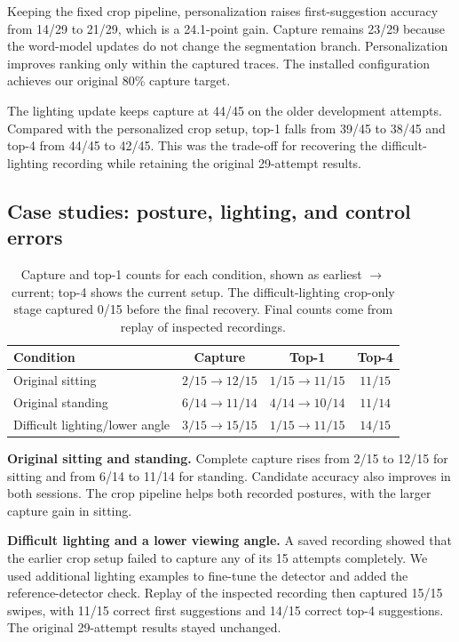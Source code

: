 \documentclass[preprint,12pt]{elsarticle}
\begin{document}
Keeping the fixed crop pipeline, personalization raises first-suggestion accuracy from 14/29 to 21/29, which is a 24.1-point gain. Capture remains 23/29 because the word-model updates do not change the segmentation branch. Personalization improves ranking only within the captured traces. The installed configuration achieves our original 80\% capture target.




The lighting update keeps capture at 44/45 on the older development attempts. Compared with the personalized crop setup, top-1 falls from 39/45 to 38/45 and top-4 from 44/45 to 42/45. This was the trade-off for recovering the difficult-lighting recording while retaining the original 29-attempt results.

\subsection{Case studies: posture, lighting, and control errors}
\begin{table}[H]
\centering
\caption{Capture and top-1 counts for each condition, shown as earliest $\to$ current; top-4 shows the current setup. The difficult-lighting crop-only stage captured 0/15 before the final recovery. Final counts come from replay of inspected recordings.}
\label{tab:cases}
\begingroup\small{}
\begin{tabularx}{\linewidth}{Xccc}
\toprule
Condition & Capture & Top-1 & Top-4 \\
\midrule
Original sitting & $2/15\to12/15$ & $1/15\to11/15$ & $11/15$ \\
Original standing & $6/14\to11/14$ & $4/14\to10/14$ & $11/14$ \\
Difficult lighting/lower angle & $3/15\to15/15$ & $1/15\to11/15$ & $14/15$ \\
\bottomrule
\end{tabularx}
\endgroup
\end{table}

\textbf{Original sitting and standing.} Complete capture rises from 2/15 to 12/15 for sitting and from 6/14 to 11/14 for standing. Candidate accuracy also improves in both sessions. The crop pipeline helps both recorded postures, with the larger capture gain in sitting.

\textbf{Difficult lighting and a lower viewing angle.} A saved recording showed that the earlier crop setup failed to capture any of its 15 attempts completely. We used additional lighting examples to fine-tune the detector and added the reference-detector check. Replay of the inspected recording then captured 15/15 swipes, with 11/15 correct first suggestions and 14/15 correct top-4 suggestions. The original 29-attempt results stayed unchanged.
\end{document}
